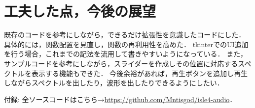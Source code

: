 \documentclass[11pt,a4j]{jarticle}%
\begin{document}
\section{工夫した点，今後の展望}
既存のコードを参考にしながら，できるだけ拡張性を意識したコードにした．
具体的には，関数配置を見直し，関数の再利用性を高めた．
tkinterでのUI追加を行う場合，これまでの記法を流用して書きやすいようになっている．
また，サンプルコードを参考にしながら，スライダーを作成しその位置に対応するスペクトルを表示する機能もできた．
今後余裕があれば，再生ボタンを追加し再生しながらスペクトルを出したり，波形を出したりできるようにしたい．

付録: 全ソースコードはこちら→\url{https://github.com/Mntisgod/isle4-audio}．\\
\end{document}
